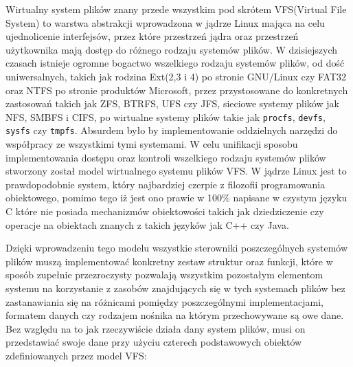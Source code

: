 \documentclass[10pt]{article}
\begin{document}
Wirtualny system plików znany przede wszystkim pod skrótem VFS(Virtual File System) to warstwa abstrakcji wprowadzona w jądrze Linux mająca na celu ujednolicenie interfejsów, przez które przestrzeń jądra oraz przestrzeń użytkownika mają dostęp do różnego rodzaju systemów plików. W dzisiejszych czasach istnieje ogromne bogactwo wszelkiego rodzaju systemów plików, od dość uniwersalnych, takich jak rodzina Ext(2,3 i 4) po stronie GNU/Linux czy FAT32 oraz NTFS po stronie produktów Microsoft, przez przystosowane do konkretnych zastosowań takich jak ZFS, BTRFS, UFS czy JFS, sieciowe systemy plików jak NFS, SMBFS i CIFS, po wirtualne systemy plików takie jak \texttt{procfs}, \texttt{devfs}, \texttt{sysfs} czy \texttt{tmpfs}. Absurdem było by implementowanie oddzielnych narzędzi do współpracy ze wszystkimi tymi systemami. W celu unifikacji sposobu implementowania dostępu oraz kontroli wszelkiego rodzaju systemów plików stworzony został model wirtualnego systemu plików VFS. W jądrze Linux jest to prawdopodobnie system, który najbardziej czerpie z filozofii programowania obiektowego, pomimo tego iż jest ono prawie w 100\% napisane w czystym języku C które nie posiada mechanizmów obiektowości takich jak dziedziczenie czy operacje na obiektach znanych z takich języków jak C++ czy Java.

Dzięki wprowadzeniu tego modelu wszystkie sterowniki poszczególnych systemów plików muszą implementować konkretny zestaw struktur oraz funkcji, które w sposób zupełnie przezroczysty pozwalają wszystkim pozostałym elementom systemu na korzystanie z zasobów znajdujących się w tych systemach plików bez zastanawiania się na różnicami pomiędzy poszczególnymi implementacjami, formatem danych czy rodzajem nośnika na którym przechowywane są owe dane. Bez względu na to jak rzeczywiście działa dany system plików, musi on przedstawiać swoje dane przy użyciu czterech podstawowych obiektów zdefiniowanych przez model VFS:
\end{document}
